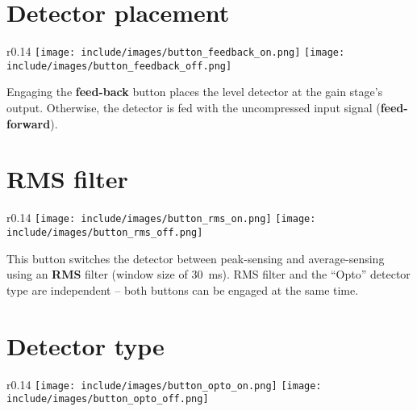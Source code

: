 \section{Detector placement}

\begin{wrapfigure}{r}{0.14\linewidth}
  \texttt{[image: include/images/button\_feedback\_on.png]}
  \newline \vspace{-0.9\baselineskip}
  \texttt{[image: include/images/button\_feedback\_off.png]}
\end{wrapfigure}

Engaging the \textbf{feed-back} button places the level detector at
the gain stage's output.  Otherwise, the detector is fed with the
uncompressed input signal (\textbf{feed-forward}).

\newpage %

\section{RMS filter}

\begin{wrapfigure}{r}{0.14\linewidth}
  \texttt{[image: include/images/button\_rms\_on.png]}
  \newline \vspace{-0.9\baselineskip}
  \texttt{[image: include/images/button\_rms\_off.png]}
\end{wrapfigure}

This button switches the detector between peak-sensing and
average-sensing using an \textbf{RMS} filter (window size of
\SI{30}{\milli\second}).  RMS filter and the ``Opto'' detector type
are independent -- both buttons can be engaged at the same time.

\section{Detector type}

\begin{wrapfigure}{r}{0.14\linewidth}
  \texttt{[image: include/images/button\_opto\_on.png]}
  \newline \vspace{-0.9\baselineskip}
  \texttt{[image: include/images/button\_opto\_off.png]}
\end{wrapfigure}

